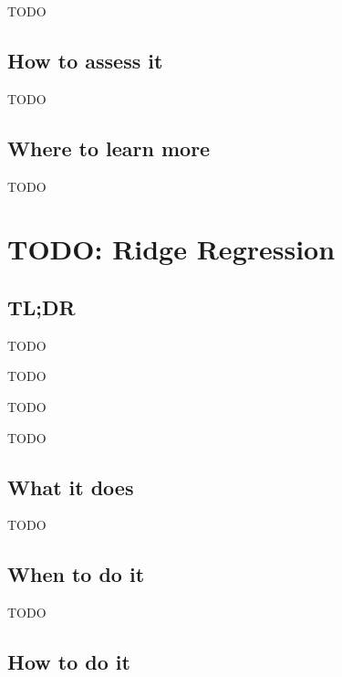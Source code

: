\documentclass[
]{book}
\providecommand{\tightlist}{%
  \setlength{\itemsep}{0pt}\setlength{\parskip}{0pt}}
\begin{document}
TODO

\hypertarget{how-to-assess-it-12}{%
\section{How to assess it}\label{how-to-assess-it-12}}

TODO

\hypertarget{where-to-learn-more-12}{%
\section{Where to learn more}\label{where-to-learn-more-12}}

TODO

\hypertarget{ridge-regression}{%
\chapter{TODO: Ridge Regression}\label{ridge-regression}}

\hypertarget{tldr-13}{%
\section{TL;DR}\label{tldr-13}}

\begin{description}
\tightlist
\item[What it does]
TODO
\item[When to do it]
TODO
\item[How to do it]
TODO
\item[How to assess it]
TODO
\end{description}

\hypertarget{what-it-does-13}{%
\section{What it does}\label{what-it-does-13}}

TODO

\hypertarget{when-to-do-it-13}{%
\section{When to do it}\label{when-to-do-it-13}}

TODO

\hypertarget{how-to-do-it-13}{%
\section{How to do it}\label{how-to-do-it-13}}
\end{document}
